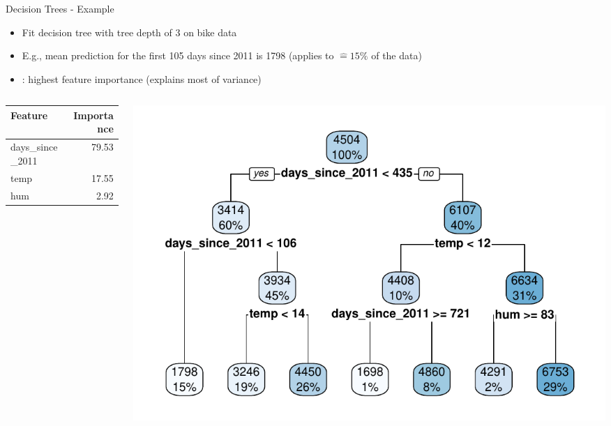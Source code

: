 \documentclass[11pt,compress,t,notes=noshow, aspectratio=169, xcolor=table]{beamer}
\begin{document}
\begin{frame}{Decision Trees - Example}
\begin{itemize}
    \item Fit decision tree with tree depth of 3 on bike data
    \item E.g., mean prediction for the first 105 days since 2011 is 1798 (applies to $\hat = 15\%$ of the data)
    \item {}: highest feature importance (explains most of variance)
\end{itemize}
\begin{columns}[T, totalwidth=\textwidth]
\begin{column}{0.37\textwidth}
\vspace{1.5cm}
\begin{table}[ht]
\centering
\scriptsize
\begin{tabular}{lr}
  \hline
 Feature & Importance \\
  \hline
days\_since\_2011 & 79.53 \\ 
  temp & 17.55 \\ 
  hum & 2.92 \\ 
   \hline
\end{tabular}
\end{table}
\end{column}
\begin{column}{0.63\textwidth}
  \includegraphics[width = \textwidth]{figure/tree.pdf} 
\end{column}
\end{columns}
 
\end{frame}
\end{document}
